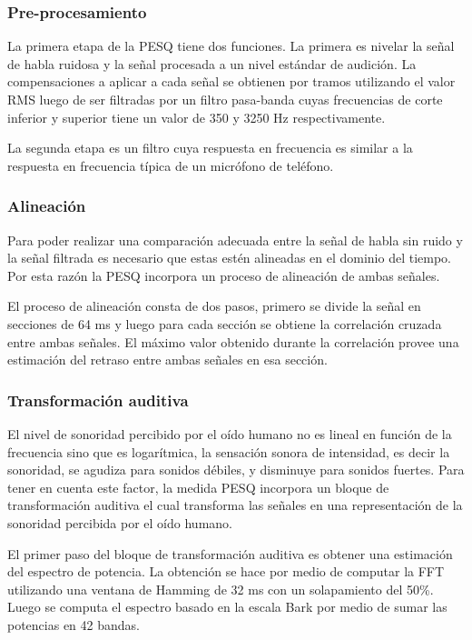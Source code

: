 \subsubsection{Pre-procesamiento}

La primera etapa de la PESQ tiene dos funciones. La primera es nivelar la señal de habla ruidosa y la señal procesada a un nivel estándar de audición. La compensaciones a aplicar a cada señal se obtienen por tramos utilizando el valor RMS luego de ser filtradas por un filtro pasa-banda cuyas frecuencias de corte inferior y superior tiene un valor de 350 y 3250 Hz respectivamente.

La segunda etapa es un filtro cuya respuesta en frecuencia es similar a la respuesta en frecuencia típica de un micrófono de teléfono.

\subsubsection{Alineación}

Para poder realizar una comparación adecuada entre la señal de habla sin ruido y la señal filtrada es necesario que estas estén alineadas en el dominio del tiempo. Por esta razón la PESQ incorpora un proceso de alineación de ambas señales.

El proceso de alineación consta de dos pasos, primero se divide la señal en secciones de 64 ms y luego para cada sección se obtiene la correlación cruzada entre ambas señales. El máximo valor obtenido durante la correlación provee una estimación del retraso entre ambas señales en esa sección.

\subsubsection{Transformación auditiva}

El nivel de sonoridad percibido por el oído humano no es lineal en función de la frecuencia sino que es logarítmica, la sensación sonora de intensidad, es decir la sonoridad, se agudiza para sonidos débiles, y disminuye para sonidos fuertes. Para tener en cuenta este factor, la medida PESQ incorpora un bloque de transformación auditiva el cual transforma las señales en una representación de la sonoridad percibida por el oído humano.

El primer paso del bloque de transformación auditiva es obtener una estimación del espectro de potencia. La obtención se hace por medio de computar la FFT utilizando una ventana de Hamming de 32 ms con un solapamiento del 50\%. Luego se computa el espectro basado en la escala Bark \cite{analytical_expressions_for_critical_band_rate_and_critical_bandwidth_as_a_function_of_frequency} por medio de sumar las potencias en 42 bandas.

